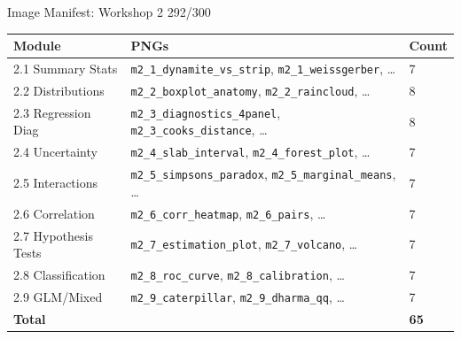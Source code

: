 \documentclass[10pt]{beamer}
\newcommand{\smark}[1]{\hfill{\scriptsize\color{codegray}#1}}
\begin{document}
\begin{frame}{Image Manifest: Workshop 2}
\smark{292/300}
\centering\scriptsize
\begin{tabular}{@{}lll@{}}
    \toprule
    \textbf{Module} & \textbf{PNGs} & \textbf{Count} \\
    \midrule
    2.1 Summary Stats       & \texttt{m2\_1\_dynamite\_vs\_strip}, \texttt{m2\_1\_weissgerber}, \ldots & 7 \\
    2.2 Distributions       & \texttt{m2\_2\_boxplot\_anatomy}, \texttt{m2\_2\_raincloud}, \ldots & 8 \\
    2.3 Regression Diag     & \texttt{m2\_3\_diagnostics\_4panel}, \texttt{m2\_3\_cooks\_distance}, \ldots & 8 \\
    2.4 Uncertainty         & \texttt{m2\_4\_slab\_interval}, \texttt{m2\_4\_forest\_plot}, \ldots & 7 \\
    2.5 Interactions        & \texttt{m2\_5\_simpsons\_paradox}, \texttt{m2\_5\_marginal\_means}, \ldots & 7 \\
    2.6 Correlation         & \texttt{m2\_6\_corr\_heatmap}, \texttt{m2\_6\_pairs}, \ldots & 7 \\
    2.7 Hypothesis Tests    & \texttt{m2\_7\_estimation\_plot}, \texttt{m2\_7\_volcano}, \ldots & 7 \\
    2.8 Classification      & \texttt{m2\_8\_roc\_curve}, \texttt{m2\_8\_calibration}, \ldots & 7 \\
    2.9 GLM/Mixed           & \texttt{m2\_9\_caterpillar}, \texttt{m2\_9\_dharma\_qq}, \ldots & 7 \\
    \midrule
    \textbf{Total}          &                                    & \textbf{65} \\
    \bottomrule
\end{tabular}
\end{frame}
\end{document}
